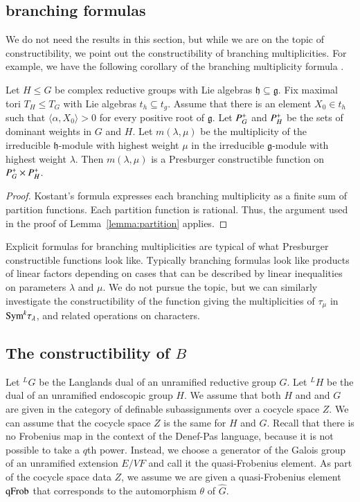 \subsection{branching formulas}

We do not need the results in this section, but while we are on the topic of constructibility,
we point out the constructibility of branching multiplicities.
For example, we have the following corollary of the branching
multiplicity formula \cite[Theorem ~8.2.1]{goodman}.

\begin{lemma} Let $H\le G$ be complex reductive groups with Lie algebras ${\mathfrak h}\subseteq {\mathfrak g}$.
Fix maximal tori $T_H\le T_G$ with Lie algebras $t_h\subseteq t_g$.  Assume that there is an element
$X_0\in t_h$ such that $\langle\alpha,X_0\rangle>0$ for every positive root of ${\mathfrak g}$.
Let $P^+_G$ and $P^+_H$ be the sets of dominant weights in $G$ and $H$.  Let $m(\lambda,\mu)$
be the multiplicity of the irreducible $\mathfrak h$-module with highest weight $\mu$ in the irreducible
$\mathfrak g$-module with highest weight $\lambda$.  Then $m(\lambda,\mu)$ is a Presburger constructible
function on $P^+_G\times P^+_H$.
\end{lemma}

\begin{proof}  Kostant's formula expresses each branching multiplicity as a finite sum of partition
functions.  Each partition function is rational.  
Thus, the argument used in the proof of Lemma~\ref{lemma:partition} applies.
\end{proof}

Explicit formulas for branching multiplicities are typical of what Presburger constructible functions look like.
Typically branching formulas look like products of linear factors depending on cases that can be
described by linear inequalities on parameters $\lambda$ and $\mu$.
We do not pursue the topic, but we can similarly investigate the constructibility of the function giving the
multiplicities of $\tau_\mu$ in ${\operatorname{Sym}}^k \tau_\lambda$, and related operations on characters.

\subsection{The constructibility of $B$}\label{sec:B}

Let ${}^LG$ be the Langlands dual of an unramified reductive group $G$.  Let ${}^LH$ be the dual of an
unramified endoscopic group $H$.  We assume that both $H$ and and $G$ are given in the category of definable subassignments
over a cocycle space $Z$.  We can assume that the cocycle space $Z$ is the same for $H$ and $G$.
Recall that there is no Frobenius map in the context of the Denef-Pas language, because it is not possible to take a $q$th power.
Instead, we choose a generator of the Galois group of an unramified extension $E/VF$ and call it the quasi-Frobenius element.
As part of the cocycle space data $Z$, we assume we are given a quasi-Frobenius element ${\operatorname{qFrob}}$ that corresponds
to the automorphism $\theta$ of $\hat G$.  

